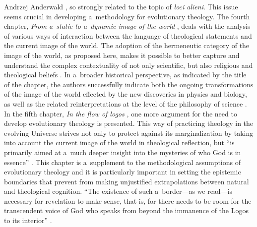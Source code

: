 \begin{newrevengenv}{Andrzej Anderwald}
\parencite*[][pp.77–84]{grygiel_teologia_2022}, %
 so strongly related to the topic of \textit{loci alieni}. This issue seems crucial in developing a~methodology for evolutionary theology. The fourth chapter, \textit{From a~static to a~dynamic image of the world} 
\parencite*[][pp.85–121]{grygiel_teologia_2022}, %
 deals with the analysis of various ways of interaction between the language of theological statements and the current image of the world. The adoption of the hermeneutic category of the image of the world, as proposed here, makes it possible to better capture and understand the complex contextuality of not only scientific, but also religious and theological beliefs 
\parencite*[][pp.86–87]{grygiel_teologia_2022}. %
 In a~broader historical perspective, as indicated by the title of the chapter, the authors successfully indicate both the ongoing transformations of the image of the world effected by the new discoveries in physics and biology, as well as the related reinterpretations at the level of the philosophy of science 
\parencite[e.g.,][pp.119–120]{grygiel_teologia_2022}. %
 In the fifth chapter, \textit{In the flow of logos} 
\parencite*[][pp.122–151]{grygiel_teologia_2022}, %
 one more argument for the need to develop evolutionary theology is presented. This way of practicing theology in the evolving Universe strives not only to protect against its marginalization by taking into account the current image of the world in theological reflection, but ``is primarily aimed at a~much deeper insight into the mysteries of who God is in essence'' 
\parencite*[][p.122]{grygiel_teologia_2022}. %
 This chapter is a~supplement to the methodological assumptions of evolutionary theology and it is particularly important in setting the epistemic boundaries that prevent from making unjustified extrapolations between natural and theological cognition. ``The existence of such a~border---as we read---is necessary for revelation to make sense, that is, for there needs to be room for the transcendent voice of God who speaks from beyond the immanence of the Logos to its interior'' 
\parencite*[][p.146]{grygiel_teologia_2022}.%





\end{newrevengenv}
